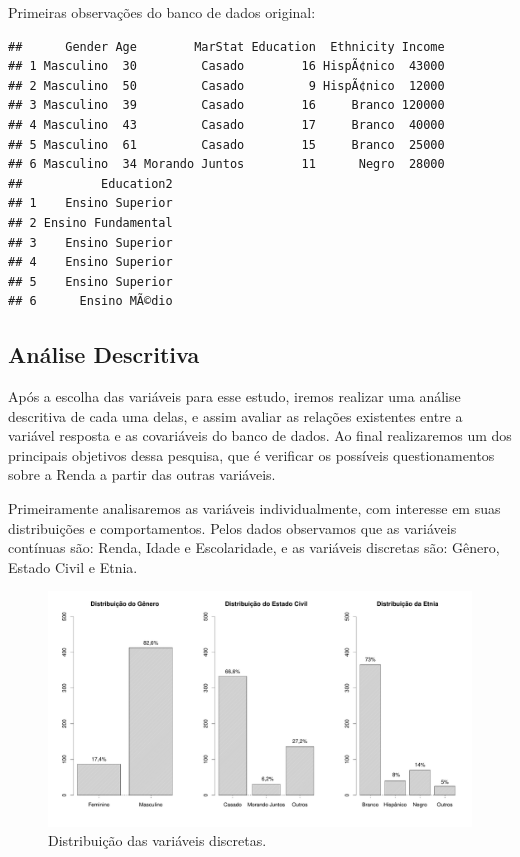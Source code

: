 \documentclass[]{article}
\begin{document}
Primeiras observações do banco de dados original:

\begin{verbatim}
##      Gender Age        MarStat Education  Ethnicity Income
## 1 Masculino  30         Casado        16 HispÃ¢nico  43000
## 2 Masculino  50         Casado         9 HispÃ¢nico  12000
## 3 Masculino  39         Casado        16     Branco 120000
## 4 Masculino  43         Casado        17     Branco  40000
## 5 Masculino  61         Casado        15     Branco  25000
## 6 Masculino  34 Morando Juntos        11      Negro  28000
##           Education2
## 1    Ensino Superior
## 2 Ensino Fundamental
## 3    Ensino Superior
## 4    Ensino Superior
## 5    Ensino Superior
## 6      Ensino MÃ©dio
\end{verbatim}

\subsection{Análise Descritiva}\label{analise-descritiva}

Após a escolha das variáveis para esse estudo, iremos realizar uma
análise descritiva de cada uma delas, e assim avaliar as relações
existentes entre a variável resposta e as covariáveis do banco de dados.
Ao final realizaremos um dos principais objetivos dessa pesquisa, que é
verificar os possíveis questionamentos sobre a Renda a partir das outras
variáveis.

Primeiramente analisaremos as variáveis individualmente, com interesse
em suas distribuições e comportamentos. Pelos dados observamos que as
variáveis contínuas são: Renda, Idade e Escolaridade, e as variáveis
discretas são: Gênero, Estado Civil e Etnia.

\begin{figure}[H]

{\centering \includegraphics[width=1\linewidth]{p100-graf} 

}

\caption{Distribuição das variáveis discretas.}\label{fig:unnamed-chunk-6}
\end{figure}
\end{document}
